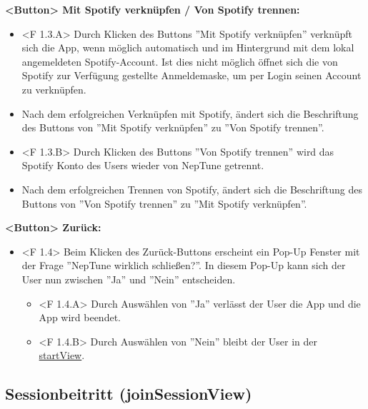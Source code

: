\documentclass[oneside, ngerman]{sdqtechreport}
\begin{document}
\textbf{<Button> Mit Spotify verknüpfen / Von Spotify trennen:}
\begin{itemize}
    \item <F 1.3.A> Durch Klicken des Buttons ''Mit Spotify verknüpfen'' verknüpft sich die App, wenn möglich automatisch und im Hintergrund mit dem lokal angemeldeten Spotify-Account. Ist dies nicht möglich öffnet sich die von Spotify zur Verfügung gestellte Anmeldemaske, um per Login seinen Account zu verknüpfen.
    \item Nach dem erfolgreichen Verknüpfen mit Spotify, ändert sich die Beschriftung des Buttons von ''Mit Spotify verknüpfen'' zu ''Von Spotify trennen''.
    \item <F 1.3.B> Durch Klicken des Buttons ''Von Spotify trennen'' wird das Spotify Konto des Users wieder von NepTune getrennt.
    \item Nach dem erfolgreichen Trennen von Spotify, ändert sich die Beschriftung des Buttons von ''Von Spotify trennen'' zu ''Mit Spotify verknüpfen''.
\end{itemize}

\textbf{<Button> Zurück:}
\begin{itemize}
    \item <F 1.4> Beim Klicken des Zurück-Buttons erscheint ein Pop-Up Fenster mit der Frage ''NepTune wirklich schließen?''. In diesem Pop-Up kann sich der User nun zwischen ''Ja'' und ''Nein'' entscheiden.
    \begin{itemize}
        \item <F 1.4.A> Durch Auswählen von ''Ja'' verlässt der User die App und die App wird beendet.
        \item <F 1.4.B> Durch Auswählen von ''Nein'' bleibt der User in der \hyperlink{startView}{startView}.
    \end{itemize}
\end{itemize}



\subsection{Sessionbeitritt (joinSessionView)}
\label{sec:Benutzeroberfläche:joinSessionView}
\end{document}
